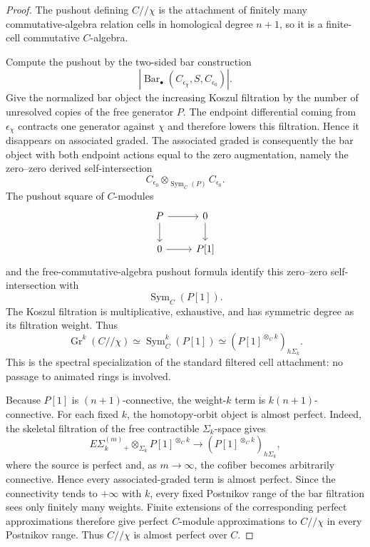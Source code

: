 \begin{proof}
The pushout defining $C//\chi$ is the attachment of finitely many
commutative-algebra relation cells in homological degree $n+1$, so it is a
finite-cell commutative $C$-algebra.

Compute the pushout by the two-sided bar construction
\[
    \left|
    \operatorname{Bar}_\bullet
    (C_{\epsilon_\chi},S,C_{\epsilon_0})
    \right|.
\]
Give the normalized bar object the increasing Koszul filtration by the number
of unresolved copies of the free generator $P$.  The endpoint differential
coming from $\epsilon_\chi$ contracts one generator against $\chi$ and
therefore lowers this filtration.  Hence it disappears on associated graded.
The associated graded is consequently the bar object with both endpoint
actions equal to the zero augmentation, namely the zero--zero derived
self-intersection
\[
    C_{\epsilon_0}\otimes_{\operatorname{Sym}_C(P)}C_{\epsilon_0}.
\]
The pushout square of $C$-modules
\[
\begin{tikzcd}
P \arrow[r] \arrow[d] & 0 \arrow[d]\\
0 \arrow[r] & P[1]
\end{tikzcd}
\]
and the free-commutative-algebra pushout formula identify this zero--zero
self-intersection with
\[
    \operatorname{Sym}_C(P[1]).
\]
The Koszul filtration is multiplicative, exhaustive, and has symmetric degree
as its filtration weight.  Thus
\[
    \operatorname{Gr}^k(C//\chi)
    \simeq
    \operatorname{Sym}^k_C(P[1])
    \simeq
    \left(P[1]^{\otimes_C k}\right)_{h\Sigma_k}.
\]
This is the spectral specialization of the standard filtered cell attachment:
no passage to animated rings is involved.

Because $P[1]$ is $(n+1)$-connective, the weight-$k$ term is
$k(n+1)$-connective.  For each fixed $k$, the homotopy-orbit object is almost
perfect.  Indeed, the skeletal filtration of the free contractible
$\Sigma_k$-space gives
\[
    E\Sigma_k^{(m)}{}_+
    \otimes_{\Sigma_k}
    P[1]^{\otimes_C k}
    \longrightarrow
    \left(P[1]^{\otimes_C k}\right)_{h\Sigma_k},
\]
where the source is perfect and, as $m\to\infty$, the cofiber becomes
arbitrarily connective.  Hence every associated-graded term is almost
perfect.  Since the connectivity tends to $+\infty$ with $k$, every fixed
Postnikov range of the bar filtration sees only finitely many weights.
Finite extensions of the corresponding perfect approximations therefore give
perfect $C$-module approximations to $C//\chi$ in every Postnikov range.  Thus
$C//\chi$ is almost perfect over $C$.


\end{proof}
